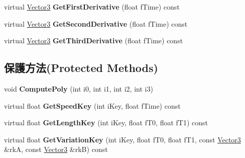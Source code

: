 \begin{DoxyCompactItemize}
\item 
virtual \hyperlink{class_magnum_1_1_vector3}{Vector3} {\bfseries Get\+First\+Derivative} (float f\+Time) const \hypertarget{class_magnum_1_1_t_c_b_spline3_a8f10ac2ed3d493546ed6b8530b738be9}{}\label{class_magnum_1_1_t_c_b_spline3_a8f10ac2ed3d493546ed6b8530b738be9}

\item 
virtual \hyperlink{class_magnum_1_1_vector3}{Vector3} {\bfseries Get\+Second\+Derivative} (float f\+Time) const \hypertarget{class_magnum_1_1_t_c_b_spline3_ae46ed7b4a74f67962efb05e8c62a5760}{}\label{class_magnum_1_1_t_c_b_spline3_ae46ed7b4a74f67962efb05e8c62a5760}

\item 
virtual \hyperlink{class_magnum_1_1_vector3}{Vector3} {\bfseries Get\+Third\+Derivative} (float f\+Time) const \hypertarget{class_magnum_1_1_t_c_b_spline3_a02faac1b40b27cb62a5f23c43983e443}{}\label{class_magnum_1_1_t_c_b_spline3_a02faac1b40b27cb62a5f23c43983e443}

\end{DoxyCompactItemize}
\subsection*{保護方法(Protected Methods)}
\begin{DoxyCompactItemize}
\item 
void {\bfseries Compute\+Poly} (int i0, int i1, int i2, int i3)\hypertarget{class_magnum_1_1_t_c_b_spline3_a86507f2b316db27446bc5055fa55d57f}{}\label{class_magnum_1_1_t_c_b_spline3_a86507f2b316db27446bc5055fa55d57f}

\item 
virtual float {\bfseries Get\+Speed\+Key} (int i\+Key, float f\+Time) const \hypertarget{class_magnum_1_1_t_c_b_spline3_a760140c2237074549f0b08f46277b37c}{}\label{class_magnum_1_1_t_c_b_spline3_a760140c2237074549f0b08f46277b37c}

\item 
virtual float {\bfseries Get\+Length\+Key} (int i\+Key, float f\+T0, float f\+T1) const \hypertarget{class_magnum_1_1_t_c_b_spline3_af26b8279e67fa9f6acd8a0f048b7d4d1}{}\label{class_magnum_1_1_t_c_b_spline3_af26b8279e67fa9f6acd8a0f048b7d4d1}

\item 
virtual float {\bfseries Get\+Variation\+Key} (int i\+Key, float f\+T0, float f\+T1, const \hyperlink{class_magnum_1_1_vector3}{Vector3} \&rkA, const \hyperlink{class_magnum_1_1_vector3}{Vector3} \&rkB) const \hypertarget{class_magnum_1_1_t_c_b_spline3_aa627bd8ca4f432bbef21677e8727abff}{}\label{class_magnum_1_1_t_c_b_spline3_aa627bd8ca4f432bbef21677e8727abff}

\end{DoxyCompactItemize}
